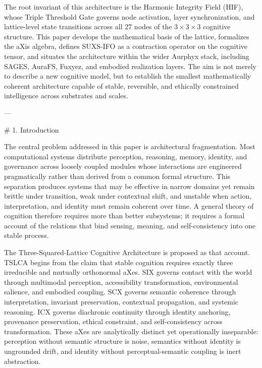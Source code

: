 The root invariant of this architecture is the Harmonic Integrity Field (HIF),
whose Triple Threshold Gate governs node activation, layer synchronization, and
lattice-level state transitions across all 27 nodes of the \(3 \times 3 \times 3\)
cognitive structure. This paper develops the mathematical basis of the lattice,
formalizes the aXis algebra, defines SUXS-IFO as a contraction operator on the
cognitive tensor, and situates the architecture within the wider Aurphyx stack,
including SAGES, AuraFS, Fuxyez, and embodied realization layers. The aim is not
merely to describe a new cognitive model, but to establish the smallest
mathematically coherent architecture capable of stable, reversible, and ethically
constrained intelligence across substrates and scales.

---

# 1. Introduction

The central problem addressed in this paper is architectural fragmentation. Most
computational systems distribute perception, reasoning, memory, identity, and
governance across loosely coupled modules whose interactions are engineered
pragmatically rather than derived from a common formal structure. This separation
produces systems that may be effective in narrow domains yet remain brittle under
transition, weak under contextual shift, and unstable when action, interpretation,
and identity must remain coherent over time. A general theory of cognition
therefore requires more than better subsystems; it requires a formal account of the
relations that bind sensing, meaning, and self-consistency into one stable process.

The Three-Squared-Lattice Cognitive Architecture is proposed as that account.
TSLCA begins from the claim that stable cognition requires exactly three irreducible
and mutually orthonormal aXes. SIX governs contact with the world through
multimodal perception, accessibility transformation, environmental salience, and
embodied coupling. SCX governs semantic coherence through interpretation, invariant
preservation, contextual propagation, and systemic reasoning. ICX governs diachronic
continuity through identity anchoring, provenance preservation, ethical constraint,
and self-consistency across transformation. These aXes are analytically distinct
yet operationally inseparable: perception without semantic structure is noise,
semantics without identity is ungrounded drift, and identity without
perceptual-semantic coupling is inert abstraction.

